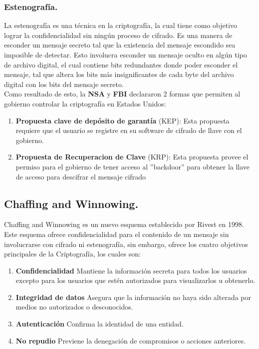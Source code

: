 \documentclass[12pt, a4paper, titlepage]{article}
\begin{document}
		\subsubsection{Estenografía.}
		
		La estenografía es una técnica en la criptografía, la cual tiene como objetivo lograr la confidencialidad sin ningún proceso de cifrado. Es una manera de esconder un mensaje secreto tal que la existencia del mensaje escondido sea imposible de detectar. Esto involucra esconder un mensaje oculto en algún tipo de archivo digital, el cual contiene bits redundantes donde poder esconder el mensaje, tal que altera los bits más insignificantes de cada byte del archivo digital con los bits del mensaje secreto.\\
		
		Como resultado de esto, la \textbf{NSA} y \textbf{FBI} declararon 2 formas que permiten al gobierno controlar la criptografía en Estados Unidos:
        \begin{enumerate}
            \item \textbf{Propuesta clave de depósito de garantía} (KEP): Esta propuesta requiere que el usuario se registre en su software de cifrado de llave con el gobierno.
            \item \textbf{Propuesta de Recuperacion de Clave} (KRP): Esta propuesta provee el permiso para el gobierno de tener acceso al ''\Gls{backdoor}'' para obtener la llave de acceso para descifrar el mensaje cifrado
        \end{enumerate}
		
		\subsection{Chaffing and Winnowing.}
		
		Chaffing and Winnowing es un nuevo esquema establecido por Rivest en 1998. Este esquema ofrece confidencialidad para el contenido de un mensaje sin involucrarse con cifrado ni estenografía, sin embargo, ofrece los cuatro objetivos principales de la Criptografía, los cuales son:
		\begin{enumerate}
			\item \textbf{Confidencialidad} Mantiene la información secreta para todos los usuarios excepto para los usuarios que estén autorizados para visualizarlos u obtenerlo.
			\item \textbf{Integridad de datos} Asegura que la información no haya sido alterada por medios no autorizados o desconocidos.
			\item \textbf{Autenticación} Confirma la identidad de una entidad.
			\item \textbf{No repudio} Previene la denegación de compromisos o acciones anteriores.
		\end{enumerate}
\end{document}
